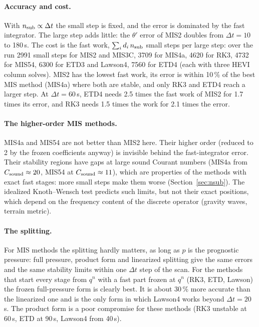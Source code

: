 \documentclass[11pt,a4paper]{article}
\newcommand{\dt}{\Delta t}
\begin{document}
\paragraph{Accuracy and cost.} With $n_{\rm sub}\propto\dt$ the small step is fixed, and the error is
dominated by the fast integrator. The large step adds little: the $\theta'$ error of MIS2 doubles from
$\dt=10$ to 180\,s. The cost is the fast work, $\sum_id_i\,n_{\rm sub}$ small steps per large step:
over the run 2991 small steps for MIS2 and MIS3C, 3709 for MIS4a, 4620 for RK3, 4732 for MIS54, 6300 for
ETD3 and Lawson4, 7560 for ETD4 (each with three HEVI column solves). MIS2 has the lowest fast work, its error is within 10\,\% of
the best MIS method (MIS4a) where both are stable, and only RK3 and ETD4 reach a larger step. At
$\dt=60$\,s, ETD4 needs 2.5 times the fast work of MIS2 for 1.7 times its error, and RK3 needs 1.5
times the work for 2.1 times the error.

\paragraph{The higher-order MIS methods.} MIS4a and MIS54 are not better than MIS2 here. Their higher
order (reduced to 2 by the frozen coefficients anyway) is invisible behind the fast-integrator error.
Their stability regions have gaps at large sound Courant numbers (MIS4a from $C_{\rm sound}\approx20$,
MIS54 at $C_{\rm sound}\approx11$), which are properties of the methods with exact fast stages: more
small steps make them worse (Section~\ref{sec:nsub}). The idealized Knoth--Wensch test predicts
such limits, but not their exact positions, which depend on the frequency content of the discrete
operator (gravity waves, terrain metric).

\paragraph{The splitting.} For MIS methods the splitting hardly matters, as long as $p$ is the prognostic
pressure: full pressure, product form and linearized splitting give the same errors and the same
stability limits within one $\dt$ step of the scan. For the methods that start every stage from
$q^n$ with a fast part frozen at $q^n$ (RK3, ETD, Lawson) the frozen full-pressure form is clearly
best. It is about 30\,\% more accurate than the linearized one and is the only form in which Lawson4
works beyond $\dt=20$\,s. The product form is a poor compromise for these methods (RK3 unstable at
60\,s, ETD at 90\,s, Lawson4 from 40\,s).
\end{document}
